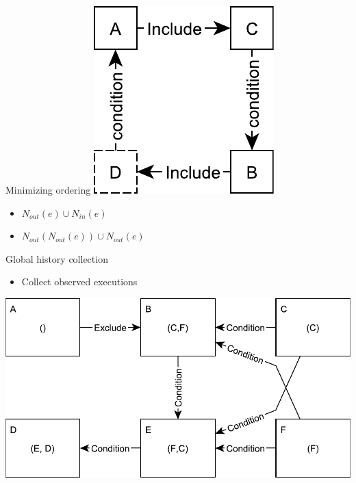 \documentclass{beamer}
\begin{document}
\begin{frame}{Minimizing ordering}%
	\centering
    \includegraphics[scale=0.5]{figures/second-degree-no-effect.pdf}
    \vspace{\fill}
    \begin{itemize}
    	\item $N_{out}(e) \cup N_{in}(e)$
    	\item $N_{out}(N_{out}(e)) \cup N_{out}(e)$
    \end{itemize}
\end{frame}

\begin{frame}{Global history collection}%
    \begin{itemize}
    	\item Collect observed executions
    \end{itemize}
    \vspace{\fill}
    \centering
    \includegraphics[scale=0.5]{figures/inconsistent-cut.pdf}
\end{frame}
\end{document}
